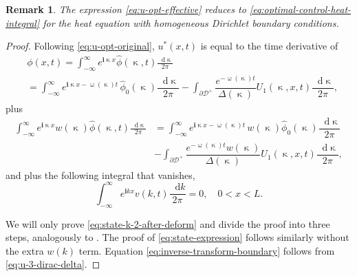 \documentclass[journal,twoside,web]{ieeecolor}
\newtheorem{remark}{Remark}
\newcommand{\D}{\mathcal{D}}
\newcommand{\state}{\phi}
\newcommand{\statehat}{\hat{\state}}
\newcommand{\im}{\mathbf{i}}
\newcommand*\diff{\mathop{}\!\mathrm{d}}
\newcommand{\wcomplex}{\upomega}
\newcommand{\kcomplex}{\upkappa}
\begin{document}
\begin{remark}
	The expression \eqref{eq:u-opt-effective} reduces to \eqref{eq:optimal-control-heat-integral} for the heat equation with homogeneous Dirichlet boundary conditions.
\end{remark}

\begin{proof}
	Following \eqref{eq:u-opt-original}, $u^*(x,t)$ is equal to the time derivative of
	\begin{equation}\label{eq:state-expression}
		\begin{aligned}
			&\state(x,t)=\int_{-\infty}^{\infty}e^{\im \kcomplex x}\statehat(\kcomplex,t)\frac{\diff \kcomplex}{2\pi}\\
			&=\int_{-\infty}^{\infty}e^{\im \kcomplex x-\wcomplex(\kcomplex)t}\, \statehat_0(\kcomplex)\dfrac{\diff \kcomplex}{2\pi}- \int_{\partial\D^+}\dfrac{e^{-\wcomplex(\kcomplex)t}}{\Delta(\kcomplex)}U_1(\kcomplex,x,t) \dfrac{\diff \kcomplex}{2\pi},
		\end{aligned}
	\end{equation}
	plus
	\begin{equation}\label{eq:state-k-2-after-deform}
		\begin{aligned}
			\int_{-\infty}^{\infty}e^{\im \kcomplex x}w(\kcomplex)\statehat(\kcomplex,t)\frac{\diff \kcomplex}{2\pi}&=\int_{-\infty}^{\infty}e^{\im \kcomplex x-\wcomplex(\kcomplex)t}\, w(\kcomplex)\statehat_0(\kcomplex)\dfrac{\diff \kcomplex}{2\pi}\\
			& - \int_{\partial\D^+}\dfrac{e^{-\wcomplex(\kcomplex)t}w(\kcomplex)}{\Delta(\kcomplex)}U_1(\kcomplex,x,t) \dfrac{\diff \kcomplex}{2\pi},
		\end{aligned}
	\end{equation}
	and plus the following integral that vanishes,
	\begin{equation}\label{eq:inverse-transform-boundary}
		\int_{-\infty}^{\infty}e^{\im k x}v(k,t)\frac{\diff k}{2\pi} = 0, \quad 0<x<L.
	\end{equation}

	We will only prove \eqref{eq:state-k-2-after-deform} and divide the proof into three steps, analogously to . 
	The proof of \eqref{eq:state-expression} follows similarly without the extra $w(k)$ term. 
	Equation \eqref{eq:inverse-transform-boundary} follows from \eqref{eq:u-3-dirac-delta}.
	

\end{proof}
\end{document}
